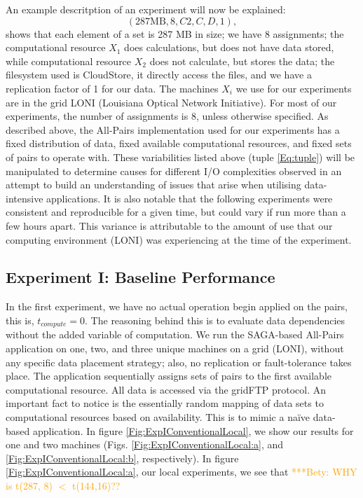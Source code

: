 \documentclass{rspublic}
\newcommand{\betynote}[1]{ {\textcolor{orange} { ***Bety: #1 }}}
\begin{document}
An example descritption of an experiment will now be explained:
 \begin{equation}
(287 \mbox{MB}, 8, C2, C, D, 1),
\end{equation}
shows that each element of a set is 287 MB in size; we have 8
assignments; the computational resource $X_1$ does calculations, but
does not have data stored, while computational resource $X_2$ does not
calculate, but stores the data; the filesystem used is CloudStore, it
directly access the files, and we have a replication factor of 1 for our
data. The machines $X_i$ we use for our experiments are in the grid LONI
(Louisiana Optical Network Initiative). For most of our experiments, the
number of assignments is 8, unless otherwise specified.  As described
above, the All-Pairs implementation used for our experiments has a fixed
distribution of data, fixed available computational resources, and fixed
sets of pairs to operate with.  These variabilities listed above (tuple
\ref{Eq:tuple}) will be manipulated to determine causes for different
I/O complexities observed in an attempt to build an understanding of
issues that arise when utilising data-intensive applications. It is also
notable that the following experiments were consistent and reproducible
for a given time, but could vary if run more than a few hours apart.
This variance is attributable to the amount of use that our computing
environment (LONI) was experiencing at the time of the experiment.

\subsection{Experiment I: Baseline Performance}
 In the first experiment, we have no actual operation begin applied on
the pairs, this is, $t_{compute}=0$. The reasoning behind this is to
evaluate data dependencies without the added variable of computation.
We run the SAGA-based All-Pairs application on one, two, and three
unique machines on a grid (LONI), without any specific data placement
strategy; also, no replication or fault-tolerance takes place. The
application sequentially assigns sets of pairs to the first available
computational resource. All data is accessed via the gridFTP protocol.
An important fact to notice is the essentially random mapping of data
sets to computational resources based on availability. This is to mimic
a naïve data-based application. In figure
\ref{Fig:ExpIConventionalLocal}, we show our results for one and two
machines (Figs. \ref{Fig:ExpIConventionalLocal:a}, and
\ref{Fig:ExpIConventionalLocal:b}, respectively). In figure
\ref{Fig:ExpIConventionalLocal:a}, our local experiments, we see that
\betynote{WHY is t(287, 8) $<$ t(144,16)??} 
\end{document}
